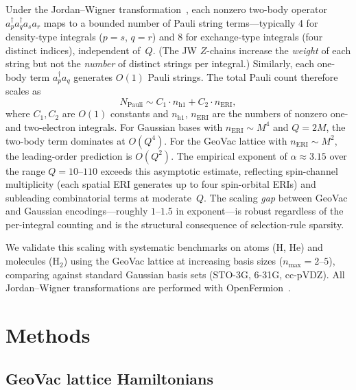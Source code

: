 \documentclass[aps,pra,twocolumn,superscriptaddress,longbibliography]{revtex4-2}
\begin{document}
Under the Jordan--Wigner transformation~\cite{jordan1928,bravyi2002},
each nonzero two-body operator
$a^\dagger_p a^\dagger_q a_s a_r$ maps to a bounded number of Pauli
string terms---typically 4 for density-type integrals ($p{=}s$, $q{=}r$)
and 8 for exchange-type integrals (four distinct indices), independent
of~$Q$.  (The JW $Z$-chains increase the \emph{weight} of each string
but not the \emph{number} of distinct strings per integral.)  Similarly,
each one-body term $a^\dagger_p a_q$ generates $O(1)$ Pauli strings.
The total Pauli count therefore scales as
\begin{equation}
  N_{\mathrm{Pauli}} \sim C_1 \cdot n_{\mathrm{h1}}
  + C_2 \cdot n_{\mathrm{ERI}},
  \label{eq:pauli_scaling}
\end{equation}
where $C_1, C_2$ are $O(1)$ constants and $n_{\mathrm{h1}}$,
$n_{\mathrm{ERI}}$ are the numbers of nonzero one- and two-electron
integrals.  For Gaussian bases with
$n_{\mathrm{ERI}} \sim M^4$ and $Q = 2M$, the two-body term dominates at
$O(Q^{4})$.  For the GeoVac lattice with
$n_{\mathrm{ERI}} \sim M^2$, the leading-order prediction is
$O(Q^2)$.  The empirical exponent of $\alpha \approx 3.15$ over the
range $Q = 10$--$110$ exceeds this asymptotic estimate, reflecting
spin-channel multiplicity (each spatial ERI generates up to four
spin-orbital ERIs) and subleading combinatorial terms at moderate~$Q$.
The scaling \emph{gap} between GeoVac and Gaussian encodings---roughly
$1$--$1.5$ in exponent---is robust regardless of the per-integral
counting and is the structural consequence of selection-rule sparsity.

We validate this scaling with systematic benchmarks on atoms (H, He) and
molecules (H$_2$) using the GeoVac lattice at increasing basis sizes
($n_{\max} = 2$--$5$), comparing against standard Gaussian basis sets
(STO-3G, 6-31G, cc-pVDZ).  All Jordan--Wigner transformations are
performed with OpenFermion~\cite{mcclean2020}.


\section{Methods}
\label{sec:methods}

\subsection{GeoVac lattice Hamiltonians}
\label{sec:geovac}
\end{document}
